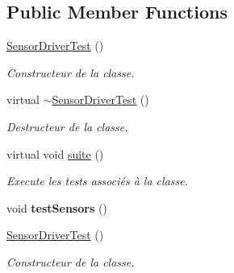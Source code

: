 \subsection*{Public Member Functions}
\begin{DoxyCompactItemize}
\item 
\mbox{\label{classtest_1_1SensorDriverTest_a9361b2d447e120e5e65a2ae3c2588ed3}} 
\hyperlink{classtest_1_1SensorDriverTest_a9361b2d447e120e5e65a2ae3c2588ed3}{Sensor\+Driver\+Test} ()
\begin{DoxyCompactList}\small\item\em Constructeur de la classe. \end{DoxyCompactList}\item 
\mbox{\label{classtest_1_1SensorDriverTest_af80b73929a3387d977d26dfeb15576cb}} 
virtual \hyperlink{classtest_1_1SensorDriverTest_af80b73929a3387d977d26dfeb15576cb}{$\sim$\+Sensor\+Driver\+Test} ()
\begin{DoxyCompactList}\small\item\em Destructeur de la classe. \end{DoxyCompactList}\item 
\mbox{\label{classtest_1_1SensorDriverTest_ab68390cc01e018be0239eaf395c5e653}} 
virtual void \hyperlink{classtest_1_1SensorDriverTest_ab68390cc01e018be0239eaf395c5e653}{suite} ()
\begin{DoxyCompactList}\small\item\em Execute les tests associés à la classe. \end{DoxyCompactList}\item 
\mbox{\label{classtest_1_1SensorDriverTest_a1c938043b193a64ea96ca03a1bd1140a}} 
void {\bfseries test\+Sensors} ()
\item 
\mbox{\label{classtest_1_1SensorDriverTest_a9361b2d447e120e5e65a2ae3c2588ed3}} 
\hyperlink{classtest_1_1SensorDriverTest_a9361b2d447e120e5e65a2ae3c2588ed3}{Sensor\+Driver\+Test} ()
\begin{DoxyCompactList}\small\item\em Constructeur de la classe. \end{DoxyCompactList}\item 

\end{DoxyCompactItemize}
